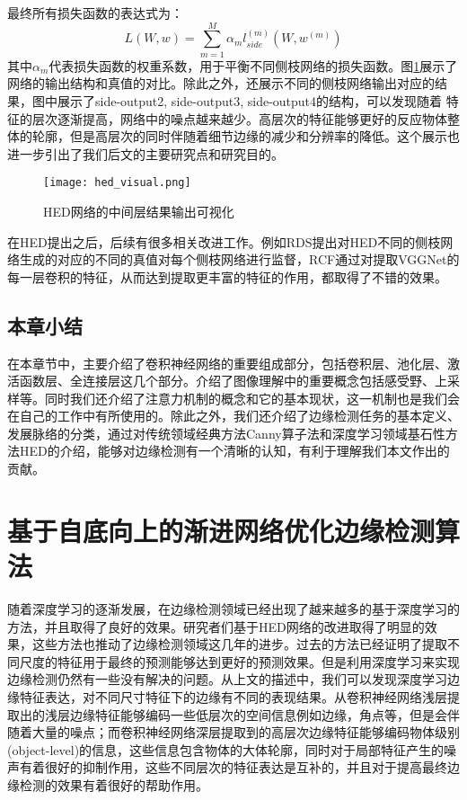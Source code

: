 \documentclass[master]{thesis-uestc}
\begin{document}
最终所有损失函数的表达式为：
\begin{equation}
L(W, w) = \sum_{m = 1}^{M} \alpha_m l_{side}^{(m)}(W, w^{(m)})
\end{equation}
其中$\alpha_m$代表损失函数的权重系数，用于平衡不同侧枝网络的损失函数。图\ref{hed_visual}展示了网络的输出结构和真值的对比。除此之外，还展示不同的侧枝网络输出对应的结果，图中展示了side-output2, side-output3, side-output4的结构，可以发现随着 特征的层次逐渐提高，网络中的噪点越来越少。高层次的特征能够更好的反应物体整体的轮廓，但是高层次的同时伴随着细节边缘的减少和分辨率的降低。这个展示也进一步引出了我们后文的主要研究点和研究目的。
\begin{figure}[h!]
    \texttt{[image: hed\_visual.png]}
    \caption{HED网络的中间层结果输出可视化}
    \label{hed_visual}
\end{figure}
在HED提出之后，后续有很多相关改进工作。例如RDS提出对HED不同的侧枝网络生成的对应的不同的真值对每个侧枝网络进行监督，RCF通过对提取VGGNet的每一层卷积的特征，从而达到提取更丰富的特征的作用，都取得了不错的效果。



\section{本章小结}
在本章节中，主要介绍了卷积神经网络的重要组成部分，包括卷积层、池化层、激活函数层、全连接层这几个部分。介绍了图像理解中的重要概念包括感受野、上采样等。同时我们还介绍了注意力机制的概念和它的基本现状，这一机制也是我们会在自己的工作中有所使用的。除此之外，我们还介绍了边缘检测任务的基本定义、发展脉络的分类，通过对传统领域经典方法Canny算子法和深度学习领域基石性方法HED的介绍，能够对边缘检测有一个清晰的认知，有利于理解我们本文作出的贡献。

\chapter{基于自底向上的渐进网络优化边缘检测算法}
随着深度学习的逐渐发展，在边缘检测领域已经出现了越来越多的基于深度学习的方法，并且取得了良好的效果。研究者们基于HED网络的改进取得了明显的效果，这些方法也推动了边缘检测领域这几年的进步。过去的方法已经证明了提取不同尺度的特征用于最终的预测能够达到更好的预测效果。但是利用深度学习来实现边缘检测仍然有一些没有解决的问题。从上文的描述中，我们可以发现深度学习边缘特征表达，对不同尺寸特征下的边缘有不同的表现结果。从卷积神经网络浅层提取出的浅层边缘特征能够编码一些低层次的空间信息例如边缘，角点等，但是会伴随着大量的噪点；而卷积神经网络深层提取到的高层次边缘特征能够编码物体级别(object-level)的信息，这些信息包含物体的大体轮廓，同时对于局部特征产生的噪声有着很好的抑制作用，这些不同层次的特征表达是互补的，并且对于提高最终边缘检测的效果有着很好的帮助作用。 
\end{document}
